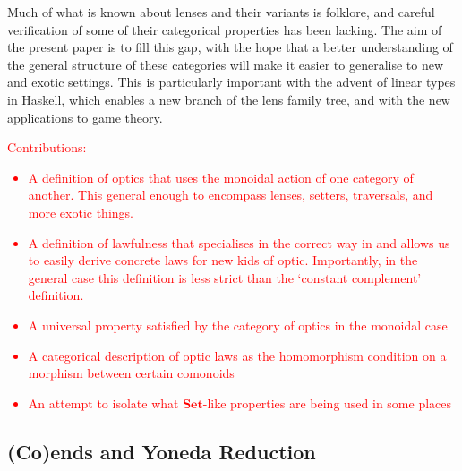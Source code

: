 \documentclass[11pt,letterpaper]{article}
\theoremstyle{plain}
\theoremstyle{definition}
\newcommand{\Set}{\mathbf{Set}}
\newcommand{\todo}[1]{\textcolor{red}{\small #1}}
\begin{document}
Much of what is known about lenses and their variants is folklore, and careful verification of some of their categorical properties has been lacking. The aim of the present paper is to fill this gap, with the hope that a better understanding of the general structure of these categories will make it easier to generalise to new and exotic settings. This is particularly important with the advent of linear types in Haskell, which enables a new branch of the lens family tree, and with the new applications to game theory.

\todo{Contributions:
  \begin{itemize}
  \item A definition of optics that uses the monoidal action of one category of another. This general enough to encompass lenses, setters, traversals, and more exotic things.
  \item A definition of lawfulness that specialises in the correct way in and allows us to easily derive concrete laws for new kids of optic. Importantly, in the general case this definition is less strict than the `constant complement' definition.
  \item A universal property satisfied by the category of optics in the monoidal case
  \item A categorical description of optic laws as the homomorphism condition on a morphism between certain comonoids
  \item An attempt to isolate what $\Set$-like properties are being used in some places
  \end{itemize}
}


\subsection{(Co)ends and Yoneda Reduction}
\end{document}
